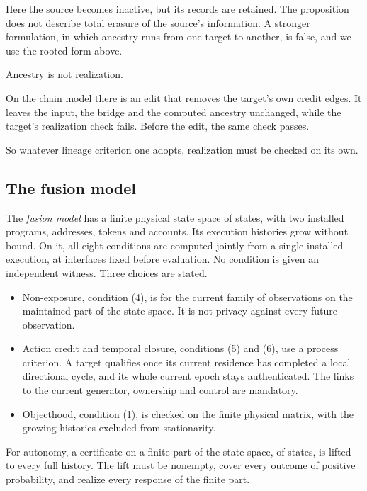 Here the source becomes inactive, but its records are retained. The
proposition does not describe total erasure of the source's information. A
stronger formulation, in which ancestry runs from one target to another, is
false, and we use the rooted form above.

Ancestry is not realization.

\begin{proposition}
\label{prop:ancestry-not-realization}
On the chain model there is an edit that removes the target's own credit edges.
It leaves the input, the bridge and the computed ancestry unchanged, while the
target's realization check fails. Before the edit, the same check passes.
\end{proposition}

So whatever lineage criterion one adopts, realization must be checked on its
own.

\subsection{The fusion model}

The \emph{fusion model} has a finite physical state space of
\snapFullNativeZeroTwoPhysicalStates{} states, with two installed programs,
addresses, tokens and accounts. Its execution histories grow without bound.
On it, all eight conditions are computed jointly from a single installed
execution, at interfaces fixed before evaluation. No condition is given an
independent witness. Three choices are stated.
\begin{itemize}
\item Non-exposure, condition (4), is for the current family of observations on
the maintained part of the state space. It is not privacy against every
future observation.
\item Action credit and temporal closure, conditions (5) and (6), use a
process criterion. A target qualifies once its current residence has completed
a local directional cycle, and its whole current epoch stays authenticated. The
links to the current generator, ownership and control are mandatory.
\item Objecthood, condition (1), is checked on the finite physical matrix, with
the growing histories excluded from stationarity.
\end{itemize}
For autonomy, a certificate on a finite part of the state space, of
\snapFullNativeZeroTwoCEightFactorStates{} states, is lifted to every full
history. The lift must be nonempty, cover every outcome of positive
probability, and realize every response of the finite part.

